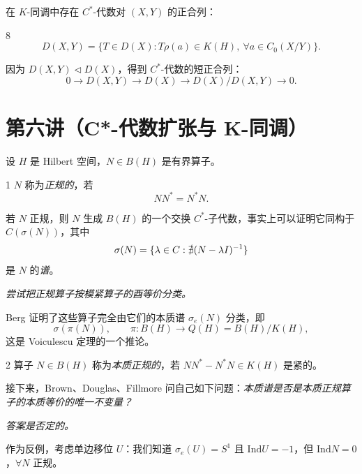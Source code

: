 在 $K$-同调中存在 $C^*$-代数对 $(X,Y)$ 的正合列：

\begin{defn}{8}
\[
  D(X,Y) = \{T \in D(X) : T\rho(a) \in K(H), \ \forall a \in C_0(X/Y)\}.
\]
\end{defn}

因为 $D(X,Y) \triangleleft D(X)$，得到 $C^*$-代数的短正合列：
\[
  0 \to D(X,Y) \to D(X) \to D(X)/D(X,Y) \to 0.
\]

\section{第六讲（C*-代数扩张与 K-同调）}

设 $H$ 是 Hilbert 空间，$N \in B(H)$ 是有界算子。

\begin{defn}{1}
$N$ 称为\emph{正规的}，若
\[
  NN^* = N^*N.
\]
\end{defn}

若 $N$ 正规，则 $N$ 生成 $B(H)$ 的一个交换 $C^*$-子代数，事实上可以证明它同构于 $C(\sigma(N))$，其中
\[
  \sigma(N) = \{\lambda \in C : \nexists (N-\lambda I)^{-1}\}
\]
是 $N$ 的\emph{谱}。


\emph{尝试把正规算子按模紧算子的酉等价分类。}

Berg 证明了这些算子完全由它们的本质谱 $\sigma_e(N)$ 分类，即
\[
  \sigma(\pi(N)), \qquad \pi : B(H) \to Q(H) = B(H)/K(H),
\]
这是 Voiculescu 定理的一个推论。

\begin{defn}{2}
算子 $N \in B(H)$ 称为\emph{本质正规的}，若 $NN^*-N^*N \in K(H)$ 是紧的。
\end{defn}

接下来，Brown、Douglas、Fillmore 问自己如下问题：\emph{本质谱是否是本质正规算子的本质等价的唯一不变量？}

\emph{答案是否定的。}

作为反例，考虑单边移位 $U$：我们知道 $\sigma_e(U) = S^1$ 且 $\mathrm{Ind} U = -1$，但 $\mathrm{Ind} N = 0$，$\forall N$ 正规。


